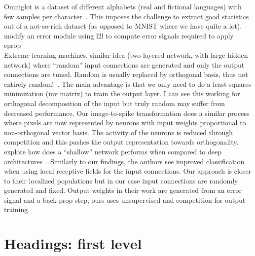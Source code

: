 \documentclass[sigconf]{acmart}
\begin{document}
Omniglot is a dataset of different alphabets (real and fictional languages) with few samples per character~\cite{Lake1332}. 
This imposes the challenge to extract good statistics out of a not-so-rich dataset (as opposed to MNIST where we have quite a lot).\\

\citeauthor{DBLP:journals/corr/abs-1901-09049} modify an error module using l2l to compute error signals required to apply eprop~\cite{DBLP:journals/corr/abs-1901-09049}\\

Extreme learning machines, similar idea (two-layered network, with large hidden network) where ``random'' input connections are generated and only the output connections  are tuned. 
Random is usually replaced by orthogonal basis, thus not entirely random!~\cite{huang2006extreme}. 
The main advantage is that we only need to do a least-squares minimization (inv matrix) to train the output layer. 
I can see this working for orthogonal decomposition of the input but truly random may suffer from decreased performance.
Our image-to-spike transformation does a similar process where pixels are now represented by neurons with input weights proportional to non-orthogonal vector basis.
The activity of the neurons is reduced through competition and this pushes the output representation towards orthogonality.\\

\citeauthor{ILLING201990} explore how does a ``shallow'' network performs when compared to deep architectures~\cite{ILLING201990}. 
Similarly to our findings, the authors see improved classification when using local receptive fields for the input connections.
Our approach is closer to their localized populations but in our case input connections are randomly generated and fixed.
Output weights in their work are generated from an error signal and a back-prop step; ours uses unsupervised and competition for output training.\\

\section{Headings: first level}


\end{document}
